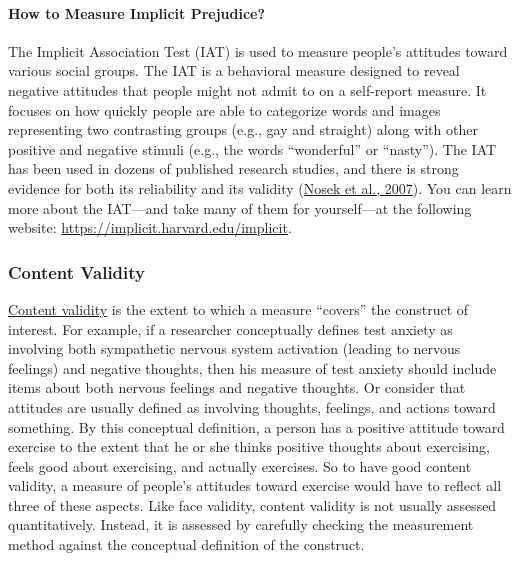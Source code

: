 \documentclass[
]{krantz}
\begin{document}
\hypertarget{how-to-measure-implicit-prejudice}{%
\paragraph*{How to Measure Implicit Prejudice?}\label{how-to-measure-implicit-prejudice}}

The Implicit Association Test (IAT) is used to measure people's attitudes toward various social groups. The IAT is a behavioral measure designed to reveal negative attitudes that people might not admit to on a self-report measure. It focuses on how quickly people are able to categorize words and images representing two contrasting groups (e.g., gay and straight) along with other positive and negative stimuli (e.g., the words ``wonderful'' or ``nasty''). The IAT has been used in dozens of published research studies, and there is strong evidence for both its reliability and its validity (\protect\hyperlink{ref-nosek2007implicit}{Nosek et al., 2007}). You can learn more about the IAT---and take many of them for yourself---at the following website: \url{https://implicit.harvard.edu/implicit}.

\hypertarget{content-validity}{%
\subsubsection*{Content Validity}\label{content-validity}}


\protect\hyperlink{content-validity-1}{Content validity} is the extent to which a measure ``covers'' the construct of interest. For example, if a researcher conceptually defines test anxiety as involving both sympathetic nervous system activation (leading to nervous feelings) and negative thoughts, then his measure of test anxiety should include items about both nervous feelings and negative thoughts. Or consider that attitudes are usually defined as involving thoughts, feelings, and actions toward something. By this conceptual definition, a person has a positive attitude toward exercise to the extent that he or she thinks positive thoughts about exercising, feels good about exercising, and actually exercises. So to have good content validity, a measure of people's attitudes toward exercise would have to reflect all three of these aspects. Like face validity, content validity is not usually assessed quantitatively. Instead, it is assessed by carefully checking the measurement method against the conceptual definition of the construct.
\end{document}
